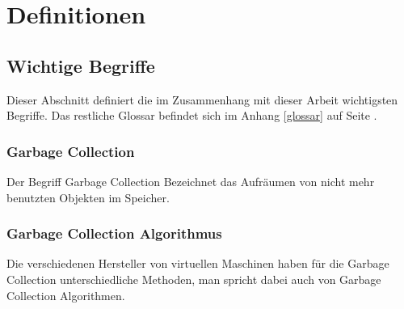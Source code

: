 \chapter{Definitionen}
\section*{Wichtige Begriffe}
Dieser Abschnitt definiert die im Zusammenhang mit dieser Arbeit wichtigsten Begriffe. Das restliche Glossar befindet sich im Anhang \ref{glossar} auf Seite \pageref{glossar}.
\subsection*{Garbage Collection}
Der Begriff Garbage Collection Bezeichnet das Aufräumen von nicht mehr benutzten Objekten im Speicher.
\subsection*{Garbage Collection Algorithmus }
Die verschiedenen Hersteller von virtuellen Maschinen haben für die Garbage Collection unterschiedliche Methoden, man spricht dabei auch von Garbage Collection Algorithmen. 